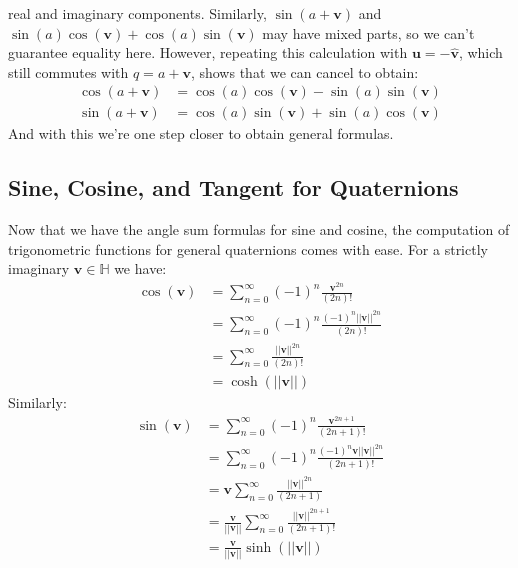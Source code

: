 \documentclass{article}
\begin{document}
            real and imaginary components. Similarly,
            $\sin(a+\mathbf{v})$ and
            $\sin(a)\cos(\mathbf{v})+\cos(a)\sin(\mathbf{v})$ may have mixed
            parts, so we can't guarantee equality here. However,
            repeating this calculation with $\mathbf{u}=-\hat{\mathbf{v}}$,
            which still commutes with $q=a+\mathbf{v}$, shows that we can cancel
            to obtain:
            \begin{align}
                \cos(a+\mathbf{v})
                &=\cos(a)\cos(\mathbf{v})-\sin(a)\sin(\mathbf{v})\\
                \sin(a+\mathbf{v})
                &=\cos(a)\sin(\mathbf{v})+\sin(a)\cos(\mathbf{v})
            \end{align}
            And with this we're one step closer to obtain general formulas.
        \subsection{Sine, Cosine, and Tangent for Quaternions}
            Now that we have the angle sum formulas for sine and cosine, the
            computation of trigonometric functions for general quaternions comes
            with ease. For a strictly imaginary $\mathbf{v}\in\mathbb{H}$
            we have:
            \begin{subequations}
                \begin{align}
                    \cos(\mathbf{v})
                    &=\sum_{n=0}^{\infty}(-1)^{n}\frac{\mathbf{v}^{2n}}{(2n)!}\\
                    &=\sum_{n=0}^{\infty}(-1)^{n}
                        \frac{(-1)^{n}||\mathbf{v}||^{2n}}{(2n)!}\\
                    &=\sum_{n=0}^{\infty}\frac{||\mathbf{v}||^{2n}}{(2n)!}\\
                    &=\cosh(||\mathbf{v}||)
                \end{align}
            \end{subequations}
            Similarly:
            \begin{subequations}
                \begin{align}
                    \sin(\mathbf{v})
                    &=\sum_{n=0}^{\infty}(-1)^{n}
                        \frac{\mathbf{v}^{2n+1}}{(2n+1)!}\\
                    &=\sum_{n=0}^{\infty}(-1)^{n}
                        \frac{(-1)^{n}\mathbf{v}||\mathbf{v}||^{2n}}{(2n+1)!}\\
                    &=\mathbf{v}\sum_{n=0}^{\infty}
                        \frac{||\mathbf{v}||^{2n}}{(2n+1)}\\
                    &=\frac{\mathbf{v}}{||\mathbf{v}||}
                        \sum_{n=0}^{\infty}
                        \frac{||\mathbf{v}||^{2n+1}}{(2n+1)!}\\
                    &=\frac{\mathbf{v}}{||\mathbf{v}||}\sinh(||\mathbf{v}||)
                \end{align}
            \end{subequations}
\end{document}
